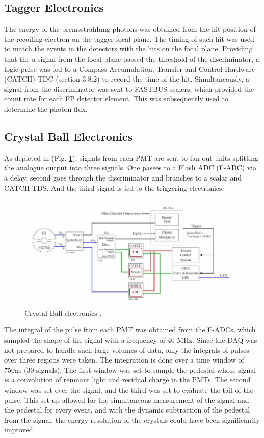 \subsection{Tagger Electronics}

\indent The energy of the bremsstrahlung photons was obtained from the hit position of the recoiling electron on the tagger focal plane. The timing of such hit was used to match the events in the detectors with the hits on the focal plane. Providing that the a signal from the focal plane passed the threshold of the discriminator, a logic pulse was fed to a Compass Accumulation, Transfer and Control Hardware (CATCH) TDC (section 3.8.2) to record the time of the hit. Simultaneously, a signal from the discriminator was sent to FASTBUS scalers, which provided the count rate for each FP detector element. This was subsequently used to determine the photon flux.

\subsection{Crystal Ball Electronics}

\indent As depicted in (Fig. \ref{cbelectronics}), signals from each PMT are sent to fan-out units splitting the analogue output into three signals. One passes to a Flash ADC (F-ADC) via a delay, second goes through the discriminator and branches to a scalar and CATCH TDS. And the third signal is fed to the triggering electronics.

\begin{figure}[H]
\begin{center}
\includegraphics[scale=1.0]{cbelectronics.png}
\caption{Crystal Ball electronics \cite{krambrich}.}
\label{cbelectronics}
\end{center}
\end{figure}

\indent The integral of the pulse from each PMT was obtained from the F-ADCs, which sampled the shape of the signal with a frequency of 40 MHz. Since the DAQ was not prepared to handle such large volumes of data, only the integrals of pulses over three regions were taken. The integration is done over a time window of 750ns (30 signals). The first window was set to sample the pedestal whose signal is a convolution of remnant light and residual charge in the PMTs. The second window was set over the signal, and the third was set to evaluate the tail of the pulse. This set up allowed for the simultaneous measurement of the signal and the pedestal for every event, and with the dynamic subtraction of the pedestal from the signal, the energy resolution of the crystals could have been significantly improved.

